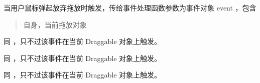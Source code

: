 \documentclass[letterpaper,10pt,english]{sphinxmanual}
\begin{document}

\begin{fulllineitems}
\label{api/component/dd/draggable:DD.Draggable.dragend}
当用户鼠标弹起放弃拖放时触发，传给事件处理函数参数为事件对象 event ，包含
\begin{quote}


\begin{fulllineitems}
\label{api/component/dd/draggable:DD.Draggable.dragend.event.drag}
自身，当前拖放对象

\end{fulllineitems}

\end{quote}

\end{fulllineitems}



\begin{fulllineitems}
\label{api/component/dd/draggable:DD.Draggable.dragenter}
同 {\hyperref[api/component/dd/droppable:DD.Droppable.dropenter]{}} ，只不过该事件在当前 Draggable 对象上触发。

\end{fulllineitems}



\begin{fulllineitems}
\label{api/component/dd/draggable:DD.Draggable.dragover}
同 {\hyperref[api/component/dd/droppable:DD.Droppable.dropover]{}} ，只不过该事件在当前 Draggable 对象上触发。

\end{fulllineitems}



\begin{fulllineitems}
\label{api/component/dd/draggable:DD.Draggable.dragexit}
同 {\hyperref[api/component/dd/droppable:DD.Droppable.dropexit]{}} ，只不过该事件在当前 Draggable 对象上触发。

\end{fulllineitems}
\end{document}
